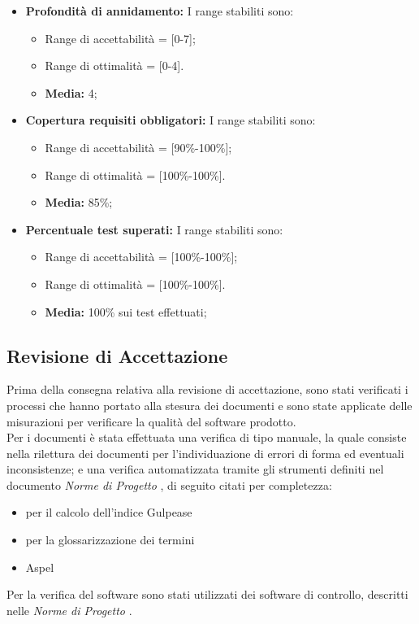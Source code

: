 \begin{itemize}
		\item \textbf{Profondità di annidamento: }I range stabiliti sono:
      \begin{itemize}
        \item Range di accettabilità = [0-7];
        \item Range di ottimalità = [0-4].
        \item \textbf{Media: }4;
      \end{itemize}      
      
      
      \item \textbf{Copertura requisiti obbligatori: }I range stabiliti sono:
      \begin{itemize}
        \item Range di accettabilità = [90\%-100\%];
        \item Range di ottimalità = [100\%-100\%].
        \item \textbf{Media: }85\%;
      \end{itemize}
      
\item \textbf{Percentuale test superati: }I range stabiliti sono:
      \begin{itemize}
        \item Range di accettabilità = [100\%-100\%];
        \item Range di ottimalità = [100\%-100\%].
        \item \textbf{Media: }100\% sui test effettuati;
      \end{itemize}

\end{itemize}

\subsection{Revisione di Accettazione}
  Prima della consegna relativa alla revisione di accettazione, sono stati verificati i processi che hanno portato alla stesura dei documenti e sono state applicate delle misurazioni per verificare la qualità del software prodotto. \\
  Per i documenti è stata effettuata una verifica di tipo manuale, la quale consiste nella rilettura dei documenti per l'individuazione di errori di forma ed eventuali inconsistenze;
  e una verifica automatizzata tramite gli strumenti definiti nel documento \emph{Norme di Progetto \VersioneNP{}}, di seguito citati per completezza:
  \begin{itemize}
    \item {}  per il calcolo dell’indice Gulpease
    \item {}  per la glossarizzazione dei termini
    \item Aspel
  \end{itemize}
  Per la verifica del software sono stati utilizzati dei software di controllo, descritti nelle \emph{Norme di Progetto \VersioneNP{}}.
